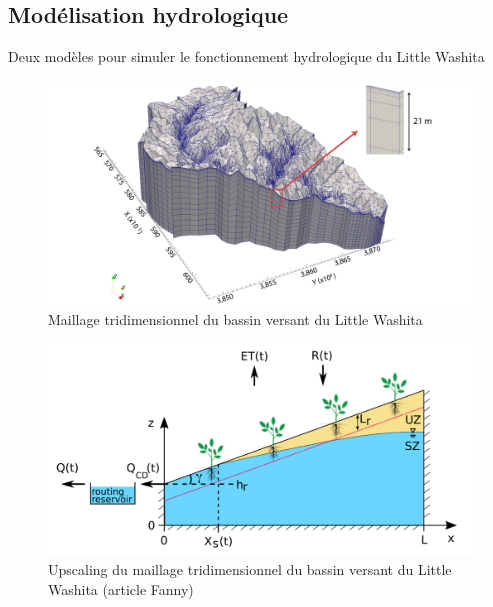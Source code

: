 \documentclass{beamer}
\numberwithin{equation}{section}
\begin{document}
	\subsection{Modélisation hydrologique}
		\begin{frame}{Deux modèles pour simuler le fonctionnement hydrologique du Little Washita}
		\begin{minipage}[b]{0.5\linewidth}
				\begin{figure}[H]
					\label{fig-Little Washita 3D}
					\begin{center}
						\includegraphics[scale=0.1]{images/little_washita3D.png}
					\end{center}
					\caption{Maillage tridimensionnel du bassin versant du Little Washita}
				\end{figure}
		\end{minipage}\hfill
		\begin{minipage}[b]{0.5\linewidth}
			\begin{figure}[H]
				\label{fig-Little Washita 2D}
				\begin{center}
					\includegraphics[scale=0.13]{images/upscaling_Little_Washita2D.png}
				\end{center}
				\caption{Upscaling du maillage tridimensionnel du bassin versant du Little Washita (article Fanny)}
			\end{figure}
		\end{minipage}
	\end{frame}
\end{document}
